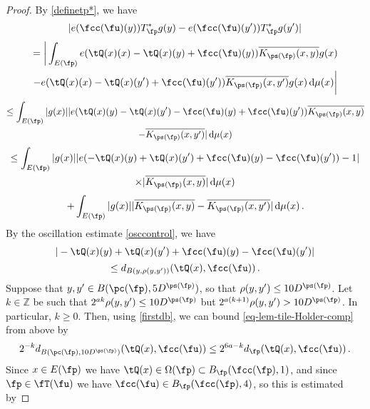     \begin{proof}
        By \eqref{definetp*}, we have
        $$
            |e(\fcc(\fu)(y)) T_{\fp}^* g(y) - e(\fcc(\fu)(y')) T_{\fp}^* g(y')|
        $$
        \begin{multline*}
            =\bigg| \int_{E(\fp)} e(\tQ(x)(x) - \tQ(x)(y) + \fcc(\fu)(y)) \overline{K_{\ps(\fp)}(x, y)} g(x) \\
            - e(\tQ(x)(x) - \tQ(x)(y') + \fcc(\fu)(y')) \overline{K_{\ps(\fp)}(x, y')} g(x) \, \mathrm{d}\mu(x)\bigg|
        \end{multline*}
        \begin{multline*}
            \leq\int_{E(\fp)} |g(x)| |e(\tQ(x)(y) - \tQ(x)(y') - \fcc(\fu)(y) + \fcc(\fu)(y'))\overline{K_{\ps(\fp)}(x, y)}\\
            - \overline{K_{\ps(\fp)}(x, y')}| \, \mathrm{d}\mu(x)
        \end{multline*}
        \begin{multline}
            \leq\int_{E(\fp)} |g(x)| |e(-\tQ(x)(y) + \tQ(x)(y') + \fcc(\fu)(y) - \fcc(\fu)(y')) - 1| \\
            \times |\overline{K_{\ps(\fp)}(x, y)}|\, \mathrm{d}\mu(x) \label{T*Holder1b}
        \end{multline}
        \begin{equation}
            + \int_{E(\fp)} |g(x)| |\overline{K_{\ps(\fp)}(x, y)} - \overline{K_{\ps(\fp)}(x, y')} |\, \mathrm{d}\mu(x)\,.\label{T*Holder1}
        \end{equation}
        By the oscillation estimate \eqref{osccontrol}, we have
        $$
            |-\tQ(x)(y) + \tQ(x)(y') + \fcc(\fu)(y) - \fcc(\fu)(y')|
        $$
        \begin{equation}
            \label{eq-lem-tile-Holder-comp}
            \le d_{B(y, \rho(y,y'))}(\tQ(x), \fcc(\fu))\,.
        \end{equation}
        Suppose that $y, y' \in B(\pc(\fp), 5D^{\ps(\fp)})$, so that $\rho(y,y') \le 10D^{\ps(\fp)}$. Let $k \in \mathbb{Z}$ be such that $2^{ak}\rho(y,y') \le 10D^{\ps(\fp)}$ but $2^{a(k+1)} \rho(y,y') > 10D^{\ps(\fp)}$. In particular, $k \ge 0$. Then, using \eqref{firstdb}, we can bound \eqref{eq-lem-tile-Holder-comp} from above by
        $$
            2^{-k} d_{B(\pc(\fp), 10 D^{\ps(\fp)})}(\tQ(x), \fcc(\fu)) \le 2^{6a - k} d_{\fp}(\tQ(x), \fcc(\fu))\,.
        $$
        Since $x \in E(\fp)$ we have $\tQ(x) \in \Omega(\fp) \subset B_{\fp}(\fcc(\fp), 1)$, and since $\fp \in \fT(\fu)$ we have $\fcc(\fu) \in B_{\fp}(\fcc(\fp), 4)$, so this is estimated by

\end{proof}
